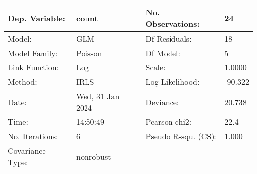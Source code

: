 \begin{tabular}{llll}
\toprule
Dep. Variable: & count &   No. Observations:   &     24 \\
\midrule
Model: & GLM &   Df Residuals:       &     18 \\
Model Family: & Poisson &   Df Model:           &      5 \\
Link Function: & Log &   Scale:              &   1.0000 \\
Method: & IRLS &   Log-Likelihood:     &  -90.322 \\
Date: & Wed, 31 Jan 2024 &   Deviance:           &   20.738 \\
Time: & 14:50:49 &   Pearson chi2:       &   22.4 \\
No. Iterations: & 6 &   Pseudo R-squ. (CS): &  1.000 \\
Covariance Type: & nonrobust &                       &   \\
\bottomrule
\end{tabular}
